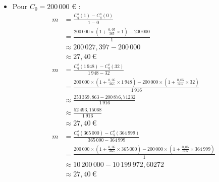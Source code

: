 \documentclass{article}
\begin{document}
\begin{enumerate}[label=\textbf{R1.\arabic*}]
\begin{itemize}
              \item Pour \( C_0 = 200\,000 \) € :
                    \[
                        \begin{aligned}
                            m & = \frac{C^s_q(1) - C^s_q(0)}{1 - 0}                                                                                                                   \\
                              & = \frac{200\,000 \times \left(1 + \frac{0{,}05}{365} \times 1\right) - 200\,000}{1}                                                                   \\
                              & \approx 200\,027{,}397 - 200\,000                                                                                                                     \\
                              & \approx 27{,}40\ \text{€}                                                                                                                           \\[1em]
                            m & = \frac{C^s_q(1\,948) - C^s_q(32)}{1\,948 - 32}                                                                                                       \\
                              & = \frac{200\,000 \times \left(1 + \frac{0{,}05}{365} \times 1\,948\right) - 200\,000 \times \left(1 + \frac{0{,}05}{365} \times 32\right)}{1\,916}    \\
                              & \approx \frac{253\,369{,}863 - 200\,876{,}71232}{1\,916}                                                                                              \\
                              & \approx \frac{52\,493{,}15068}{1\,916}                                                                                                                \\
                              & \approx 27{,}40\ \text{€}                                                                                                                           \\[1em]
                            m & = \frac{C^s_q(365\,000) - C^s_q(364\,999)}{365\,000 - 364\,999}                                                                                       \\
                              & = \frac{200\,000 \times \left(1 + \frac{0{,}05}{365} \times 365\,000\right) - 200\,000 \times \left(1 + \frac{0{,}05}{365} \times 364\,999\right)}{1} \\
                              & \approx 10\,200\,000 - 10\,199\,972,60272                                                                                                             \\
                              & \approx 27{,}40\ \text{€}                                                                                                                           
                        \end{aligned}
                    \]
          \end{itemize}
          

\end{enumerate}
\end{document}
